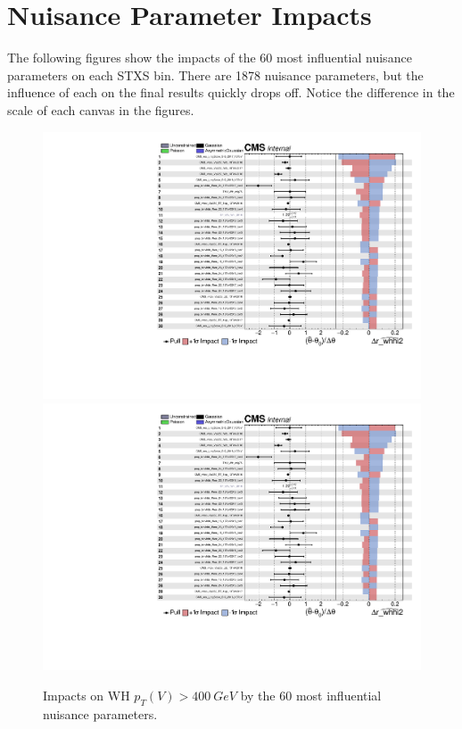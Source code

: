 \chapter{Nuisance Parameter Impacts} \label{app:impacts}

The following figures show the impacts of the 60 most influential nuisance parameters
on each STXS bin.
There are 1878 nuisance parameters, but the influence of each on the final results
quickly drops off.
Notice the difference in the scale of each canvas in the figures.

\begin{figure}
  \centering
  \includegraphics[width=0.85\linewidth,page=1]{figures/impacts/impacts_r_whhi2.pdf}
  \includegraphics[width=0.85\linewidth,page=2]{figures/impacts/impacts_r_whhi2.pdf}
  \caption[Impacts for WH $p_T(V) > \SI{400}{GeV}$]{
    Impacts on WH $p_T(V) > \SI{400}{GeV}$ by the 60 most influential nuisance parameters.
  }
  \label{fig:impacts_r_whhi2}
\end{figure}


